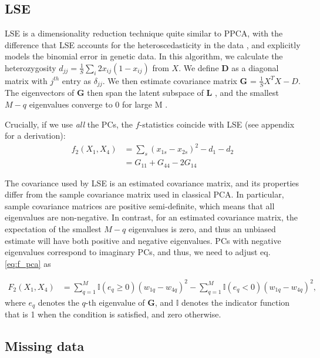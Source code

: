 \documentclass[12pt, letterpaper]{article}
\newcommand{\MG}{\mathbf{G}}
\begin{document}
\subsection{LSE}\label{theory-lse}

LSE is a dimensionality reduction technique quite similar to PPCA, with the difference that LSE accounts for the heteroscedasticity in the data \cite{chen_consistent_2015}, and explicitly models the binomial error in genetic data. In this algorithm, we calculate the heterozygosity  $d_{jj} = \frac{1}{S}\sum_i 2x_{ij}(1- x_{ij})$ from $X$. We define $\mathbf{D}$ as a diagonal matrix with $j^{th}$ entry as $\delta_{jj}$. We then estimate covariance matrix $\MG$ = $\frac{1}{S}X^TX - D$. The eigenvectors of $\mathbf{G}$ then span the latent subspace of $\mathbf{L}$ , and the smallest $M-q$ eigenvalues converge to 0 for large M \cite{cabreros_likelihood-free_2019}.


Crucially, if we use \emph{all} the PCs, the $f$-statistics coincide with LSE (see appendix for a derivation): 
\begin{align}
    f_2(X_1, X_4) &= \sum_s (x_{1s} - x_{2s})^2 - d_1 - d_2 \nonumber\\
    &= G_{11} + G_{44} - 2 G_{14}
\end{align}

The covariance used by LSE is an estimated covariance matrix, and its properties differ from the sample covariance matrix used in classical PCA. In particular, sample covariance matrices are positive semi-definite, which means that all eigenvalues are non-negative. In contrast, for an estimated covariance matrix, the expectation of the smallest $M-q$ eigenvalues is zero, and thus an unbiased estimate will have both positive and negative eigenvalues. PCs with negative eigenvalues correspond to imaginary PCs, and thus, we need to adjust eq. \ref{eq:f_pca} as


\begin{align}\label{eq:f_lse}
F_2(X_1,X_4) &= \sum_{q=1}^{M}\mathbb{I}(e_q \geq 0) (w_{1q} - w_{4q})^2 - \sum_{q=1}^M \mathbb{I}(e_q <0) (w_{1q} - w_{4q})^2,
\end{align}
where $e_q$ denotes the $q$-th eigenvalue of $\mathbf{G}$, and $\mathbb{I}$ denotes the indicator function that is 1 when the condition is satisfied, and zero otherwise.


\subsection{Missing data}
\end{document}
